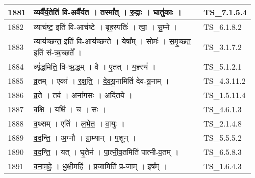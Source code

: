 \documentclass[17pt]{extarticle}
\begin{document}
\begin{longtable}{||p{0.4in}||p{4.9in}||p{0.9in}||}
    \hline
        
    1881 & व्यवै᳚र्य॒तेति॑ वि{-}अवै᳚र्यत   ।   तस्मा᳚त्   ।   रु॒द्राः   ।   घातु॑काः   ।    & TS\_7.1.5.4       \\
    
    \hline
        
    1882 & व्याच॑ष्ट॒ इति॑ वि{-}आच॑ष्टे   ।   बृह॒स्पतिः॑   ।   त्वा॒   ।   सु॒म्ने   ।    & TS\_6.1.8.2       \\
    
    \hline
        
    1883 & व्याय॑च्छन्त॒ इति॑ वि{-}आय॑च्छन्ते   ।   येषा᳚म्   ।   सोमः॑   ।   स॒मृ॒च्छत॒ इति॑ सं{-}ऋ॒च्छते᳚   ।    & TS\_3.1.7.2       \\
    
    \hline
        
    1884 & व्यृ॑द्ध॒मिति॒ वि{-}ऋ॒द्ध॒म्   ।   वै   ।   ए॒तत्   ।   य॒ज्ञ्स्य॑   ।    & TS\_5.1.2.1       \\
    
    \hline
        
    1885 & व्र॒तम्   ।   एका᳚   ।   र॒क्ष॒ति॒   ।   दे॒व॒यू॒नामिति॑ देव{-}यू॒नाम्   ।    & TS\_4.3.11.2       \\
    
    \hline
        
    1886 & व्र॒ते   ।   तव॑   ।   अना॑गसः   ।   अदि॑तये   ।    & TS\_1.5.11.4       \\
    
    \hline
        
    1887 & व॒क्षि॒   ।   यक्षि॑   ।   च॒   ।   सः   ।    & TS\_4.6.1.3       \\
    
    \hline
        
    1888 & व॒थ्सम्   ।   एति॑   ।   ल॒भे॒त॒   ।   वा॒युः   ।    & TS\_2.1.4.8       \\
    
    \hline
        
    1889 & व॒द॒न्ति॒   ।   अ॒ग्नौ   ।   ग्रा॒म्यान्   ।   प॒शून्   ।    & TS\_5.5.5.2       \\
    
    \hline
        
    1890 & व॒द॒न्ति॒   ।   यत्   ।   घृ॒तेन॑   ।   पा॒त्नी॒व॒तमिति॑ पात्नी{-}व॒तम्   ।    & TS\_6.5.8.3       \\
    
    \hline
        
    1891 & व॒ना॒म॒हे॒   ।   धु॒क्षी॒महि॑   ।   प्र॒जामिति॑ प्र{-}जाम्   ।   इष᳚म्   ।    & TS\_1.6.4.3       \\
    

\end{longtable}
\end{document}

